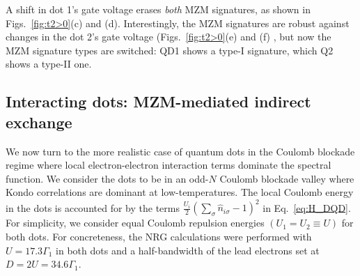 \documentclass[showpacs,aps,prb,reprint,superscriptaddress]{revtex4-1}
\begin{document}
A shift in dot 1's gate voltage erases \emph{both} MZM signatures, as shown in Figs.\ \ref{fig:t2>0}(c) and (d). Interestingly, the MZM signatures are robust against changes in the dot 2's gate voltage (Figs.\ \ref{fig:t2>0}(e) and (f) , but now the MZM signature types are switched: QD1 shows a type-I signature, which Q2 shows a type-II one.  



\subsection{Interacting dots: MZM-mediated indirect exchange \label{subsec:IndirectExchange}}


We now turn to the more realistic case of quantum dots in the Coulomb blockade regime where local electron-electron interaction terms dominate the spectral function. We consider the dots to be in an odd-$N$ Coulomb blockade valley where Kondo correlations are dominant at low-temperatures. The local Coulomb energy in the dots is accounted for by the terms $\frac{U_i}{2}(\sum_{\sigma} \hat{n}_{i\sigma}-1)^{2}$ in Eq.\ \eqref{eq:H_DQD}. For simplicity, we consider equal Coulomb repulsion energies $(U_1 \!=\! U_2 \equiv U)$ for both dots. For concreteness, the NRG calculations were performed with $U \!=\! 17.3\Gamma_1$ in both dots and a half-bandwidth of the lead electrons set at $D=2U=34.6\Gamma_1$. 
\end{document}
